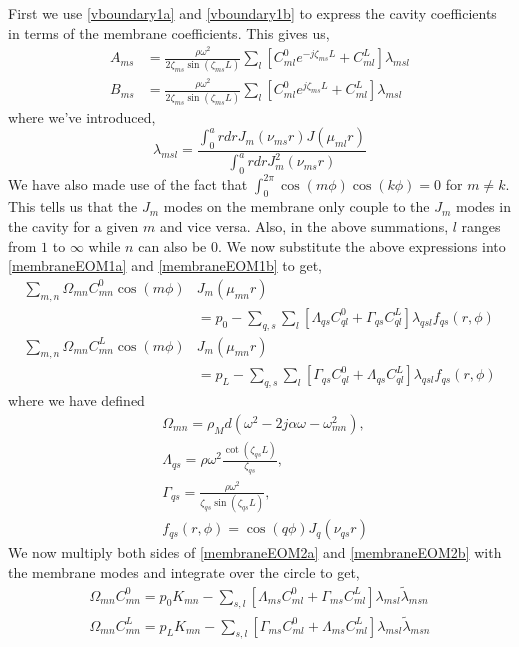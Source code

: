 First we use \eqref{vboundary1a} and \eqref{vboundary1b} to express the cavity coefficients in terms
of the membrane coefficients. This gives us,
\begin{align}
 A_{ms}&=\frac{\rho\omega^2}{2\zeta_{ms}\sin(\zeta_{ms}L)}\sum_{l}\left[C^0_{ml}e^{-j\zeta_{ms}L}+C^L_{ml}\right]\lambda_{msl}\\
 B_{ms}&=\frac{\rho\omega^2}{2\zeta_{ms}\sin(\zeta_{ms}L)}\sum_{l}\left[C^0_{ml}e^{j\zeta_{ms}L}+C^L_{ml}\right]\lambda_{msl}
\end{align}
where we've introduced,
\begin{equation*}
 \lambda_{msl}=\frac{\int^a_0 rdr J_m(\nu_{ms}r)J(\mu_{ml}r)}{\int^a_0 rdrJ^2_m(\nu_{ms}r)}
\end{equation*}
We have also made use of the fact that $\int_0^{2\pi}\cos(m\phi)\cos(k\phi)=0$ for $m\neq k$. This tells
us that the $J_m$ modes on the membrane only couple to the $J_m$ modes in the cavity for a given $m$ and vice
versa. Also, in the above summations, $l$ ranges from $1$ to $\infty$ while $n$ can also be $0$.
We now substitute the above expressions into \eqref{membraneEOM1a} and \eqref{membraneEOM1b} to get,
\begin{align}
 \sum_{m,n}\Omega_{mn}C^0_{mn}\cos(m\phi)&J_m(\mu_{mn}r)\nonumber\\
 &=p_0-\sum_{q,s}\sum_{l}\left[\Lambda_{qs}C^0_{ql}+\Gamma_{qs}C^L_{ql}\right]\lambda_{qsl}f_{qs}(r,\phi)\label{membraneEOM2a}\\
 \sum_{m,n}\Omega_{mn}C^L_{mn}\cos(m\phi)&J_m(\mu_{mn}r)\nonumber\\
 &=p_L-\sum_{q,s}\sum_{l}\left[\Gamma_{qs}C^0_{ql}+\Lambda_{qs}C^L_{ql}\right]\lambda_{qsl}f_{qs}(r,\phi)\label{membraneEOM2b}
\end{align}
where we have defined
\begin{align}
 &\Omega_{mn}=\rho_M d\left(\omega^2-2j\alpha\omega-\omega^2_{mn}\right),\\
 &\Lambda_{qs}=\rho\omega^2 \frac{\cot(\zeta_{qs}L)}{\zeta_{qs}},\\
 &\Gamma_{qs}=\frac{\rho\omega^2}{\zeta_{qs}\sin(\zeta_{qs}L)},\\
 &f_{qs}(r,\phi)=\cos(q\phi)J_q(\nu_{qs}r)
\end{align}
We now multiply both sides of \eqref{membraneEOM2a} and \eqref{membraneEOM2b} with the membrane modes and
integrate over the circle to get,
\begin{align}
 \Omega_{mn}C^0_{mn}=p_0K_{mn}-\sum_{s,l}\left[\Lambda_{ms}C^0_{ml}+\Gamma_{ms}C^L_{ml}\right]\lambda_{msl}\widetilde{\lambda}_{msn}\\
 \Omega_{mn}C^L_{mn}=p_LK_{mn}-\sum_{s,l}\left[\Gamma_{ms}C^0_{ml}+\Lambda_{ms}C^L_{ml}\right]\lambda_{msl}\widetilde{\lambda}_{msn}
\end{align}

